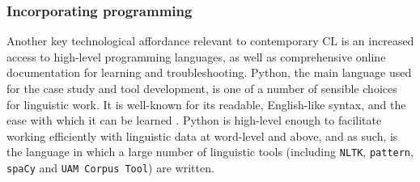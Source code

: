 

\subsubsection{Incorporating programming}

Another key technological affordance relevant to contemporary \gls{CL} is an increased access to high\hyp{}level programming languages, as well as comprehensive online documentation for learning and troubleshooting. Python, the main language used for the case study and tool development, is one of a number of sensible choices for linguistic work. It is well\hyp{}known for its readable, English\hyp{}like syntax, and the ease with which it can be learned \cite{radenski_python_2006}. Python is high\hyp{}level enough to facilitate working efficiently with linguistic data at word\hyp{}level and above, and as such, is the language in which a large number of linguistic tools (including \texttt{NLTK}, \texttt{pattern}, \texttt{spaCy} and \texttt{UAM Corpus Tool}) are written.

